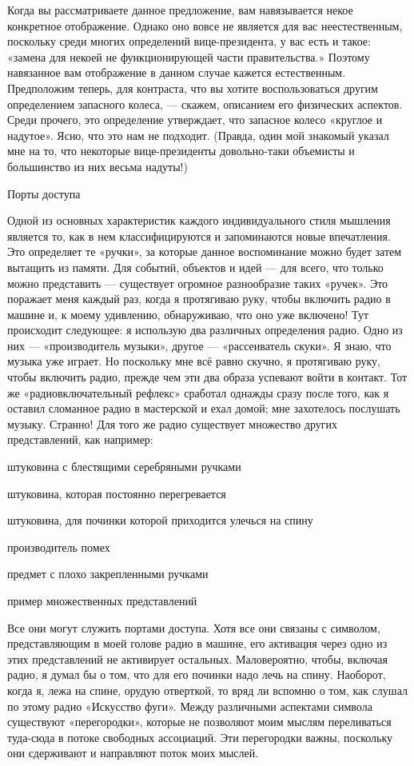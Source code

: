 \documentclass[../main.tex]{subfiles}
\begin{document}
Когда вы рассматриваете данное предложение, вам навязывается некое конкретное отображение. Однако оно вовсе не является для вас неестественным, поскольку среди многих определений вице-президента, у вас есть и такое: «замена для некоей не функционирующей части правительства.» Поэтому навязанное вам отображение в данном случае кажется естественным. Предположим теперь, для контраста, что вы хотите воспользоваться другим определением запасного колеса, --- скажем, описанием его физических аспектов. Среди прочего, это определение утверждает, что запасное колесо «круглое и надутое». Ясно, что это нам не подходит. (Правда, один мой знакомый указал мне на то, что некоторые вице-президенты довольно-таки объемисты и большинство из них весьма надуты!)

Порты доступа

Одной из основных характеристик каждого индивидуального стиля мышления является то, как в нем классифицируются и запоминаются новые впечатления. Это определяет те «ручки», за которые данное воспоминание можно будет затем вытащить из памяти. Для событий, объектов и идей --- для всего, что только можно представить --- существует огромное разнообразие таких «ручек». Это поражает меня каждый раз, когда я протягиваю руку, чтобы включить радио в машине и, к моему удивлению, обнаруживаю, что оно уже включено! Тут происходит следующее: я использую два различных определения радио. Одно из них --- «производитель музыки», другое --- «рассеиватель скуки». Я знаю, что музыка уже играет. Но поскольку мне всё равно скучно, я протягиваю руку, чтобы включить радио, прежде чем эти два образа успевают войти в контакт. Тот же «радиовключательный рефлекс» сработал однажды сразу после того, как я оставил сломанное радио в мастерской и ехал домой; мне захотелось послушать музыку. Странно! Для того же радио существует множество других представлений, как например:

штуковина с блестящими серебряными ручками

штуковина, которая постоянно перегревается

штуковина, для починки которой приходится улечься на спину

производитель помех

предмет с плохо закрепленными ручками

пример множественных представлений

Все они могут служить портами доступа. Хотя все они связаны с символом, представляющим в моей голове радио в машине, его активация через одно из этих представлений не активирует остальных. Маловероятно, чтобы, включая радио, я думал бы о том, что для его починки надо лечь на спину. Наоборот, когда я, лежа на спине, орудую отверткой, то вряд ли вспомню о том, как слушал по этому радио «Искусство фуги». Между различными аспектами символа существуют «перегородки», которые не позволяют моим мыслям переливаться туда-сюда в потоке свободных ассоциаций. Эти перегородки важны, поскольку они сдерживают и направляют поток моих мыслей.
\end{document}
